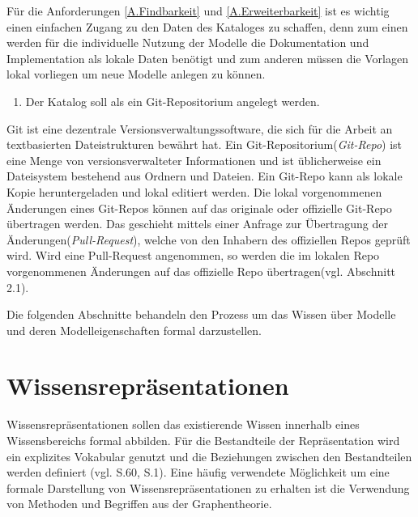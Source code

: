 Für die Anforderungen \ref{A.Findbarkeit} und \ref{A.Erweiterbarkeit} ist es wichtig einen einfachen Zugang zu den Daten des Kataloges zu schaffen, denn zum einen werden für die individuelle Nutzung der Modelle die Dokumentation und Implementation als lokale Daten benötigt und zum anderen müssen die Vorlagen lokal vorliegen um neue Modelle anlegen zu können.
\begin{enumerate}[resume*]
	\item \label{E.Git}Der Katalog soll als ein Git-Repositorium angelegt werden.
\end{enumerate}
Git ist eine dezentrale Versionsverwaltungssoftware, die sich für die Arbeit an textbasierten Dateistrukturen bewährt hat. Ein Git-Repositorium(\textit{Git-Repo}) ist eine Menge von versionsverwalteter Informationen und ist üblicherweise ein Dateisystem bestehend aus Ordnern und Dateien. Ein Git-Repo kann als lokale Kopie heruntergeladen und lokal editiert werden. Die lokal vorgenommenen Änderungen eines Git-Repos können auf das originale oder offizielle Git-Repo übertragen werden. Das geschieht mittels einer Anfrage zur Übertragung der Änderungen(\textit{Pull-Request}), welche von den Inhabern des offiziellen Repos geprüft wird. Wird eine Pull-Request angenommen, so werden die im lokalen Repo vorgenommenen Änderungen auf das offizielle Repo übertragen(vgl. \cite{KNHE20a} Abschnitt 2.1).

Die folgenden Abschnitte behandeln den Prozess um das Wissen über Modelle und deren Modelleigenschaften formal darzustellen.
\section{Wissensrepräsentationen}
\label{Ch:Vorbetrachtung:Sec:Wissensrepräsentaionen}
Wissensrepräsentationen sollen das existierende Wissen innerhalb eines Wissensbereichs formal abbilden. Für die Bestandteile der Repräsentation wird ein explizites Vokabular genutzt und die Beziehungen zwischen den Bestandteilen werden definiert (vgl. \cite{BEN16} S.60, \cite{SEB04} S.1). Eine häufig verwendete Möglichkeit um eine formale Darstellung von Wissensrepräsentationen zu erhalten ist die Verwendung von Methoden und Begriffen aus der Graphentheorie.

